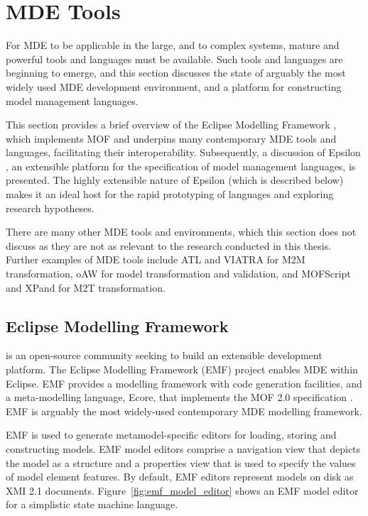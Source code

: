
\section{MDE Tools}
\label{sec:mde_tools}
For MDE to be applicable in the large, and to complex systems, mature and powerful tools and languages must be available. Such tools and languages are beginning to emerge, and this section discusses the state of arguably the most widely used MDE development environment, and a platform for constructing model management languages.

This section provides a brief overview of the Eclipse Modelling Framework \cite{emf}, which implements MOF and underpins many contemporary MDE tools and languages, facilitating their interoperability. Subsequently, a discussion of Epsilon \cite{epsilon}, an extensible platform for the specification of model management languages, is presented. The highly extensible nature of Epsilon (which is described below) makes it an ideal host for the rapid prototyping of languages and exploring research hypotheses.  

There are many other MDE tools and environments, which this section does not discuss as they are not as relevant to the research conducted in this thesis. Further examples of MDE tools include ATL \cite{atl} and VIATRA \cite{viatra} for M2M transformation, oAW \cite{oaw} for model transformation and validation, and MOFScript \cite{oldevik05toward} and XPand \cite{xpand} for M2T transformation.

\subsection{Eclipse Modelling Framework}
\label{subsec:emf}
\cite{eclipse} is an open-source community seeking to build an extensible development platform. The Eclipse Modelling Framework (EMF) project \cite{emf} enables MDE within Eclipse. EMF provides a modelling framework with code generation facilities, and a meta-modelling language, Ecore, that implements the MOF 2.0 specification \cite{mof}. EMF is arguably the most widely-used contemporary MDE modelling framework.

EMF is used to generate metamodel-specific editors for loading, storing and constructing models. EMF model editors comprise a navigation view that depicts the model as a structure and a properties view that is used to specify the values of model element features. By default, EMF editors represent models on disk as XMI 2.1 \cite{xmi} documents. Figure~\ref{fig:emf_model_editor} shows an EMF model editor for a simplistic state machine language. 

